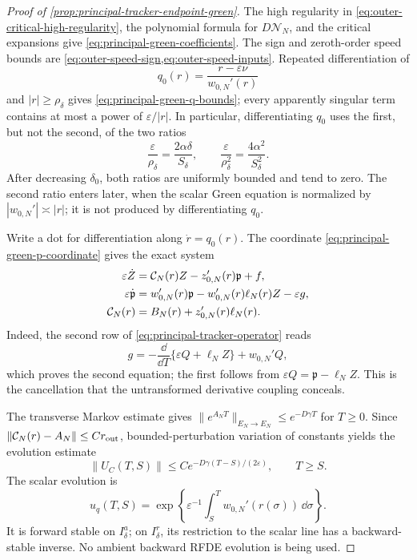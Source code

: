 \begin{proof}[Proof of \cref{prop:principal-tracker-endpoint-green}]
The high regularity in
\cref{eq:outer-critical-high-regularity}, the polynomial formula for
\(D\mathcal N_N\), and the critical expansions give
\cref{eq:principal-green-coefficients}.  The sign and zeroth-order speed
bounds are \cref{eq:outer-speed-sign,eq:outer-speed-inputs}.  Repeated
differentiation of
\[
 q_0(r)=\frac{r-\varepsilon\nu}{w_{0,N}'(r)}
\]
and \(|r|\ge\rho_\delta\) gives
\cref{eq:principal-green-q-bounds}; every apparently singular term contains
at most a power of \(\varepsilon/|r|\).  In particular, differentiating
\(q_0\) uses the first, but not the second, of the two ratios
\begin{equation}
 \frac{\varepsilon}{\rho_\delta}
 =\frac{2\alpha\delta}{S_\delta},
 \qquad
 \frac{\varepsilon}{\rho_\delta^2}
 =\frac{4\alpha^2}{S_\delta^2}.                    \label{eq:principal-green-small-ratios}
\end{equation}
After decreasing \(\delta_0\), both ratios are uniformly bounded and tend
to zero.  The second ratio enters later, when the scalar Green equation is
normalized by \(|w_{0,N}'|\asymp|r|\); it is not produced by
differentiating \(q_0\).

Write a dot for differentiation along \(\dot r=q_0(r)\).  The coordinate
\cref{eq:principal-green-p-coordinate} gives the exact system
\begin{align}
 \varepsilon\dot Z
 &=\mathcal C_N(r)Z-z_{0,N}'(r)\mathfrak p+f,\notag\\
 \varepsilon\dot{\mathfrak p}
 &=w_{0,N}'(r)\mathfrak p
   -w_{0,N}'(r)\ell_N(r)Z-\varepsilon g,\notag\\
 \mathcal C_N(r)&=B_N(r)+z_{0,N}'(r)\ell_N(r).     \label{eq:principal-green-transformed-system}
\end{align}
Indeed, the second row of
\cref{eq:principal-tracker-operator} reads
\[
 g=-\frac{\dd}{\dd T}\{\varepsilon Q+\ell_NZ\}+w_{0,N}'Q,
\]
which proves the second equation; the first follows from
\(\varepsilon Q=\mathfrak p-\ell_NZ\).  This is the cancellation that the
untransformed derivative coupling conceals.

The transverse Markov estimate gives
\(\|e^{A_NT}\|_{E_N\to E_N}\le e^{-D\gamma T}\) for \(T\ge0\).
Since \(\|\mathcal C_N(r)-A_N\|\le Cr_{\rm out}\), bounded-perturbation variation of
constants yields the evolution estimate
\begin{equation}
 \|U_C(T,S)\|
 \le C e^{-D\gamma(T-S)/(2\varepsilon)},
 \qquad T\ge S.                                    \label{eq:principal-green-C-evolution}
\end{equation}
The scalar evolution is
\begin{equation}
 u_q(T,S)=\exp\left\{\varepsilon^{-1}
      \int_S^T w_{0,N}'(r(\sigma))\,\dd\sigma\right\}.       \label{eq:principal-green-scalar-evolution}
\end{equation}
It is forward stable on \(I_\delta^a\); on \(I_\delta^r\), its restriction
to the scalar line has a backward-stable inverse.  No ambient backward RFDE
evolution is being used.


\end{proof}
